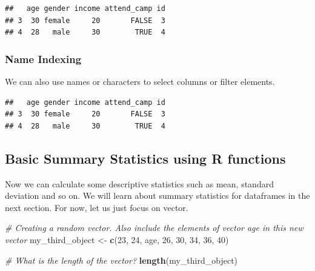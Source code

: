 \documentclass[
]{article}
\newenvironment{Shaded}{\begin{snugshade}}{\end{snugshade}}
\newcommand{\CommentTok}[1]{\textcolor[rgb]{0.56,0.35,0.01}{\textit{#1}}}
\newcommand{\DecValTok}[1]{\textcolor[rgb]{0.00,0.00,0.81}{#1}}
\newcommand{\FunctionTok}[1]{\textcolor[rgb]{0.13,0.29,0.53}{\textbf{#1}}}
\newcommand{\NormalTok}[1]{#1}
\newcommand{\OtherTok}[1]{\textcolor[rgb]{0.56,0.35,0.01}{#1}}
\newcommand{\SpecialCharTok}[1]{\textcolor[rgb]{0.81,0.36,0.00}{\textbf{#1}}}
\begin{document}
\begin{verbatim}
##   age gender income attend_camp id
## 3  30 female     20       FALSE  3
## 4  28   male     30        TRUE  4
\end{verbatim}

\subsubsection{Name Indexing}\label{name-indexing}

We can also use names or characters to select columns or filter
elements.

\begin{Shaded}
\end{Shaded}

\begin{verbatim}
##   age gender income attend_camp id
## 3  30 female     20       FALSE  3
## 4  28   male     30        TRUE  4
\end{verbatim}

\subsection{Basic Summary Statistics using R
functions}\label{basic-summary-statistics-using-r-functions}

Now we can calculate some descriptive statistics such as mean, standard
deviation and so on. We will learn about summary statistics for
dataframes in the next section. For now, let us just focus on vector.

\begin{Shaded}
\begin{Highlighting}[]
\CommentTok{\# Creating a random vector. Also include the elements of vector age in this new vector}
\NormalTok{my\_third\_object }\OtherTok{\textless{}{-}} \FunctionTok{c}\NormalTok{(}\DecValTok{23}\NormalTok{, }\DecValTok{24}\NormalTok{, age, }\DecValTok{26}\NormalTok{, }\DecValTok{30}\NormalTok{, }\DecValTok{34}\NormalTok{, }\DecValTok{36}\NormalTok{, }\DecValTok{40}\NormalTok{)}

\CommentTok{\# What is the length of the vector?}
\FunctionTok{length}\NormalTok{(my\_third\_object)}
\end{Highlighting}
\end{Shaded}
\end{document}
